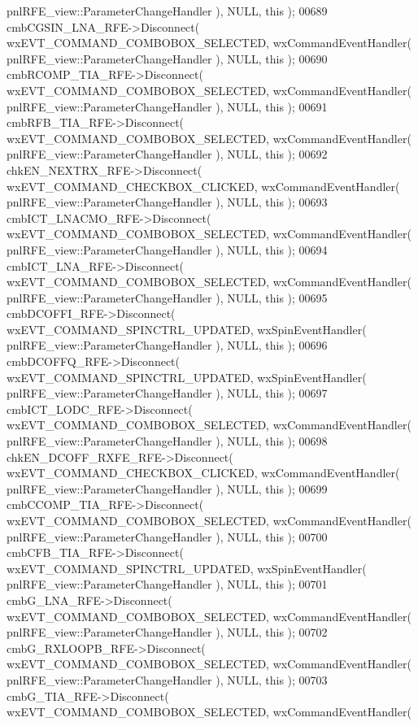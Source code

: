 \begin{DoxyCode}
      pnlRFE_view::ParameterChangeHandler ), NULL, \textcolor{keyword}{this} );
00689     cmbCGSIN_LNA_RFE->Disconnect( wxEVT\_COMMAND\_COMBOBOX\_SELECTED, wxCommandEventHandler( 
      pnlRFE_view::ParameterChangeHandler ), NULL, \textcolor{keyword}{this} );
00690     cmbRCOMP_TIA_RFE->Disconnect( wxEVT\_COMMAND\_COMBOBOX\_SELECTED, wxCommandEventHandler( 
      pnlRFE_view::ParameterChangeHandler ), NULL, \textcolor{keyword}{this} );
00691     cmbRFB_TIA_RFE->Disconnect( wxEVT\_COMMAND\_COMBOBOX\_SELECTED, wxCommandEventHandler( 
      pnlRFE_view::ParameterChangeHandler ), NULL, \textcolor{keyword}{this} );
00692     chkEN_NEXTRX_RFE->Disconnect( wxEVT\_COMMAND\_CHECKBOX\_CLICKED, wxCommandEventHandler( 
      pnlRFE_view::ParameterChangeHandler ), NULL, \textcolor{keyword}{this} );
00693     cmbICT_LNACMO_RFE->Disconnect( wxEVT\_COMMAND\_COMBOBOX\_SELECTED, wxCommandEventHandler( 
      pnlRFE_view::ParameterChangeHandler ), NULL, \textcolor{keyword}{this} );
00694     cmbICT_LNA_RFE->Disconnect( wxEVT\_COMMAND\_COMBOBOX\_SELECTED, wxCommandEventHandler( 
      pnlRFE_view::ParameterChangeHandler ), NULL, \textcolor{keyword}{this} );
00695     cmbDCOFFI_RFE->Disconnect( wxEVT\_COMMAND\_SPINCTRL\_UPDATED, wxSpinEventHandler( 
      pnlRFE_view::ParameterChangeHandler ), NULL, \textcolor{keyword}{this} );
00696     cmbDCOFFQ_RFE->Disconnect( wxEVT\_COMMAND\_SPINCTRL\_UPDATED, wxSpinEventHandler( 
      pnlRFE_view::ParameterChangeHandler ), NULL, \textcolor{keyword}{this} );
00697     cmbICT_LODC_RFE->Disconnect( wxEVT\_COMMAND\_COMBOBOX\_SELECTED, wxCommandEventHandler( 
      pnlRFE_view::ParameterChangeHandler ), NULL, \textcolor{keyword}{this} );
00698     chkEN_DCOFF_RXFE_RFE->Disconnect( wxEVT\_COMMAND\_CHECKBOX\_CLICKED, wxCommandEventHandler( 
      pnlRFE_view::ParameterChangeHandler ), NULL, \textcolor{keyword}{this} );
00699     cmbCCOMP_TIA_RFE->Disconnect( wxEVT\_COMMAND\_COMBOBOX\_SELECTED, wxCommandEventHandler( 
      pnlRFE_view::ParameterChangeHandler ), NULL, \textcolor{keyword}{this} );
00700     cmbCFB_TIA_RFE->Disconnect( wxEVT\_COMMAND\_SPINCTRL\_UPDATED, wxSpinEventHandler( 
      pnlRFE_view::ParameterChangeHandler ), NULL, \textcolor{keyword}{this} );
00701     cmbG_LNA_RFE->Disconnect( wxEVT\_COMMAND\_COMBOBOX\_SELECTED, wxCommandEventHandler( 
      pnlRFE_view::ParameterChangeHandler ), NULL, \textcolor{keyword}{this} );
00702     cmbG_RXLOOPB_RFE->Disconnect( wxEVT\_COMMAND\_COMBOBOX\_SELECTED, wxCommandEventHandler( 
      pnlRFE_view::ParameterChangeHandler ), NULL, \textcolor{keyword}{this} );
00703     cmbG_TIA_RFE->Disconnect( wxEVT\_COMMAND\_COMBOBOX\_SELECTED, wxCommandEventHandler( 

\end{DoxyCode}
